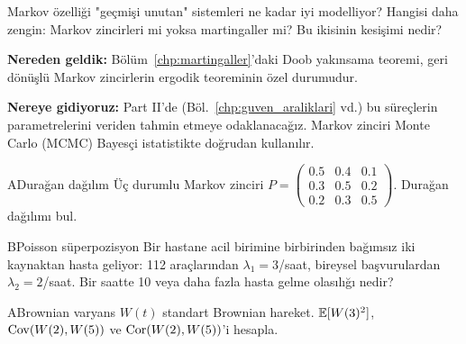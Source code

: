 \begin{ozyansima}
Markov özelliği "geçmişi unutan" sistemleri ne kadar iyi modelliyor? Hangisi daha zengin: Markov zincirleri mi yoksa martingaller mi? Bu ikisinin kesişimi nedir?
\end{ozyansima}

\begin{kopru}
\textbf{Nereden geldik:} Bölüm~\ref{chp:martingaller}'daki Doob yakınsama teoremi, geri dönüşlü Markov zincirlerin ergodik teoreminin özel durumudur.

\textbf{Nereye gidiyoruz:} Part II'de (Böl.~\ref{chp:guven_araliklari} vd.) bu süreçlerin parametrelerini veriden tahmin etmeye odaklanacağız. Markov zinciri Monte Carlo (MCMC) Bayesçi istatistikte doğrudan kullanılır.
\end{kopru}


\cozumlualistirmalar

\begin{alistirma}[Al.10.1]{A}{Durağan dağılım}
Üç durumlu Markov zinciri $P=\begin{pmatrix}0.5&0.4&0.1\\0.3&0.5&0.2\\0.2&0.3&0.5\end{pmatrix}$. Durağan dağılımı bul.
\end{alistirma}

\begin{alistirma}[Al.10.2]{B}{Poisson süperpozisyon}
Bir hastane acil birimine birbirinden bağımsız iki kaynaktan hasta geliyor: 112 araçlarından $\lambda_1=3$/saat, bireysel başvurulardan $\lambda_2=2$/saat. Bir saatte 10 veya daha fazla hasta gelme olasılığı nedir?
\end{alistirma}

\alistirmalar

\begin{alistirma}[Al.10.3]{A}{Brownian varyans}
$W(t)$ standart Brownian hareket. $\mathbb{E}[W(3)^2]$, $\operatorname{Cov}(W(2),W(5))$ ve $\operatorname{Cor}(W(2),W(5))$'i hesapla.
\end{alistirma}

